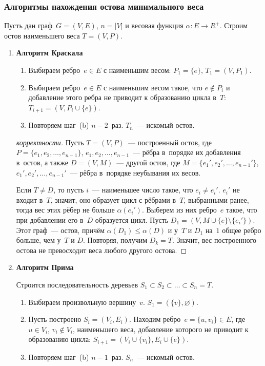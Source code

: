 \subsubsection{Алгоритмы нахождения остова минимального веса}
Пусть дан граф~$G = (V, E)$, $n = |V|$ и весовая функция $\alpha \colon E \to R^+$.
Строим остов наименьшего веса $T = (V, P)$.
\begin{enumerate}
	\item{}\textbf{Алгоритм Краскала}
	\begin{enumerate}
		\item Выбираем ребро~$e \in E$ с наименьшим весом: $P_1 = \{ e \}$, $T_1 = (V, P_1)$.
		\item Выбираем ребро~$e \in E$ с наименьшим весом такое, что $e \notin P_i$ и добавление этого ребра не приводит к образованию цикла в~$T$: $T_{i+1} = (V, P_i \cup \{ e \})$.
		\item Повторяем шаг~(b) $n - 2$~раз.
		$T_n$~--- искомый остов.
	\end{enumerate}
	\begin{proof}[корректности]
		Пусть $T = (V, P)$~--- построенный остов, где
		$P = \{ e_1, e_2, \ldots, \allowbreak e_{n-1} \}$, $e_1, e_2, \ldots, \allowbreak e_{n-1}$~--- рёбра в~порядке их добавления в~остов, а также $D = (V, M)$~--- другой остов, где
		$M = \{ e_1', e_2', \ldots, \allowbreak e_{n-1}' \}$, $e_1', e_2', \ldots, \allowbreak e_{n-1}'$~--- рёбра в~порядке неубывания их весов.
		
		Если $T \neq D$, то пусть $i$~--- наименьшее число такое, что $e_i \neq e_i'$.
		$e_i'$ не входит в~$T$, значит, оно образует цикл с рёбрами в~$T$, выбранными ранее, тогда вес этих рёбер не больше $\alpha(e_i')$.
		Выберем из них ребро~$e$ такое, что при добавлении его в~$D$ образуется цикл.
		Пусть $D_1 = (V, M \cup \{ e \} \setminus \{ e_i' \})$.
		Этот граф~--- остов, причём $\alpha(D_1) \leqslant \alpha(D)$ и у~$T$ и $D_1$ на~$1$ общее ребро больше, чем у~$T$ и $D$.
		Повторяя, получим $D_k = T$.
		Значит, вес построенного остова не превосходит веса любого другого остова.
	\end{proof}

	\item{}\textbf{Алгоритм Прима}
	
	Строится последовательность деревьев $S_1 \subset S_2 \subset \ldots \subset S_n = T$.
	\begin{enumerate}
		\item Выбираем произвольную вершину~$v$.
		$S_1 = (\{ v \}, \varnothing)$.
		\item Пусть построено $S_i = (V_i, E_i)$.
		Находим ребро~$e = \{ u, v_i \} \in E$, где $u \in V_i$, $v_i \notin V_i$, наименьшего веса, добавление которого не приводит к образованию цикла: $S_{i+1} = (V_i \cup \{ v_i \}, E_i \cup \{ e \})$.
		\item Повторяем шаг~(b) $n - 1$~раз.
		$S_n$~--- искомый остов.
	\end{enumerate}
\end{enumerate}
